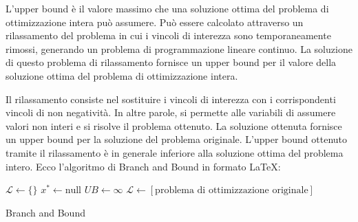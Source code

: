L'upper bound è il valore massimo che una soluzione ottima del problema di ottimizzazione intera può assumere. Può essere calcolato attraverso un rilassamento del problema in cui i vincoli di interezza sono temporaneamente rimossi, generando un problema di programmazione lineare continuo. La soluzione di questo problema di rilassamento fornisce un upper bound per il valore della soluzione ottima del problema di ottimizzazione intera. 

Il rilassamento consiste nel sostituire i vincoli di interezza con i corrispondenti vincoli di non negatività. In altre parole, si permette alle variabili di assumere valori non interi e si risolve il problema ottenuto. La soluzione ottenuta fornisce un upper bound per la soluzione del problema originale. L'upper bound ottenuto tramite il rilassamento è in generale inferiore alla soluzione ottima del problema intero.
Ecco l'algoritmo di Branch and Bound in formato LaTeX:

\begin{algorithm}[H]
\SetAlgoLined
{}
$\mathcal{L} \leftarrow \{\}$ 
$x^* \leftarrow \text{null}$ 
$UB \leftarrow \infty$ 
$\mathcal{L} \leftarrow [\text{problema di ottimizzazione originale}]$ 
\caption{Branch and Bound}
\end{algorithm}

